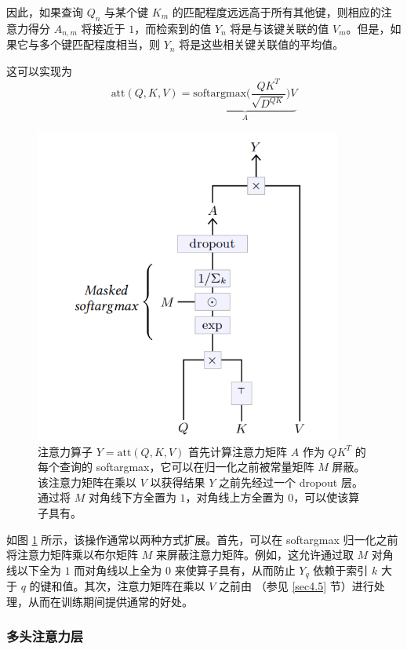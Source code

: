 因此，如果查询 $Q_n$ 与某个键 $K_m$ 的匹配程度远远高于所有其他键，则相应的注意力得分 $A_{n,m}$ 将接近于 $1$，而检索到的值 $Y_n$ 将是与该键关联的值 $V_m$。但是，如果它与多个键匹配程度相当，则 $Y_n$ 将是这些相关键关联值的平均值。

这可以实现为
\[\text{att}(Q,K,V) = \underbrace{\text{softargmax}\bigg(\frac{QK^T}{\sqrt{D^{QK}}}\bigg)V}_{A}\]

\begin{figure}
    \centering
    \includegraphics[width=0.9\textwidth]{fig/fig4.12.png}
    \caption[完全注意力算子]{注意力算子 $Y = \text{att}(Q,K,V)$ 首先计算注意力矩阵 $A$ 作为 $QK^T$ 的每个查询的 softargmax，它可以在归一化之前被常量矩阵 $M$ 屏蔽。该注意力矩阵在乘以 $V$ 以获得结果 $Y$ 之前先经过一个 dropout 层。通过将 $M$ 对角线下方全置为 $1$，对角线上方全置为 $0$，可以使该算子具有。}
    \label{fig4.12}
\end{figure}

如图 \ref{fig4.12} 所示，该操作通常以两种方式扩展。首先，可以在 softargmax 归一化之前将注意力矩阵乘以布尔矩阵 $M$ 来屏蔽注意力矩阵。例如，这允许通过取 $M$ 对角线以下全为 $1$ 而对角线以上全为 $0$ 来使算子具有，从而防止 $Y_q$ 依赖于索引 $k$ 大于 $q$ 的键和值。其次，注意力矩阵在乘以 $V$ 之前由 （参见 \ref{sec4.5} 节）进行处理，从而在训练期间提供通常的好处。

\subsubsection*{多头注意力层}

